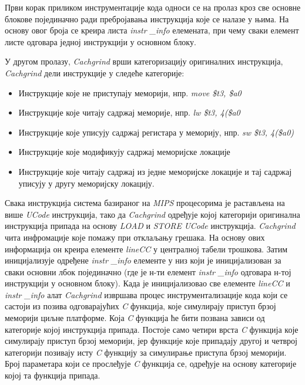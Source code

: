 \documentclass[12pt,oneside]{memoir}
\begin{document}
\indent Први корак приликом инструментације кода односи се на пролаз кроз све основне блокове појединачно ради пребројавања инструкција које се налазе у њима. На основу овог броја се креира листа \textit{instr \_info} елемената, при чему сваки елемент листе одговара једној инструкцији у основном блоку.

\indent У другом пролазу, \textit{Cachgrind} врши категоризацију оригиналних инструкција, \textit{Cachgrind} дели инструкције у следеће категорије:

\begin{itemize}
  \item Инструкције које не приступају меморији, нпр. \textit{move \$t3, \$a0}
  \item Инструкције које читају садржај меморије, нпр. \textit{lw \$t3, 4(\$a0}
  \item Инструкције које уписују садржај регистара у меморију, нпр. \textit{sw \$t3, 4(\$a0)}
  \item Инструкције које модификују садржај меморијске локације
  \item Инструкције које читају садржај из једне меморијске локације и тај садржај уписују у другу меморијску локацију.
\end{itemize}

\indent Свака инструкција система базираног на \textit{MIPS} процесорима је растављена на више \textit{UCode} инструкција, тако да \textit{Cachgrind} одређује којој категорији оригинална инструкција припада на основу \textit{LOAD} и \textit{STORE} \textit{UCode} инструкција. \textit{Cachgrind} чита инфромације које помажу при отклаљању грешака. На основу ових информација он креира елементе \textit{lineCC} у централној табели трошкова. Затим иницијализује одређене \textit{instr \_info} елементе у  низ који је иницијализован за сваки основни лбок појединачно (где је н-ти елемент \textit{instr \_info} одговара н-тој инструкцији у основном блоку). Када је иницијализовао све елементе \textit{lineCC} и \textit{instr \_info} алат \textit{Cachgrind} извршава процес инструментализације кода који се састоји из позива одговарајућих \textit{C} функција, које симулирају приступ брзој меморији циљне платформе. Која \textit{C} функција ће бити позвана зависи од категорије којој инструкција припада. Постоје само четири врста \textit{C} функција које симулирају приступ брзој меморији, јер функције које припадају другој и четврој категорији позивају исту \textit{C} функцију за симулирање приступа брзој меморији. Број параметара који се прослеђује \textit{C} функција се, одређује на основу категорије којој та функција припада.
\end{document}

